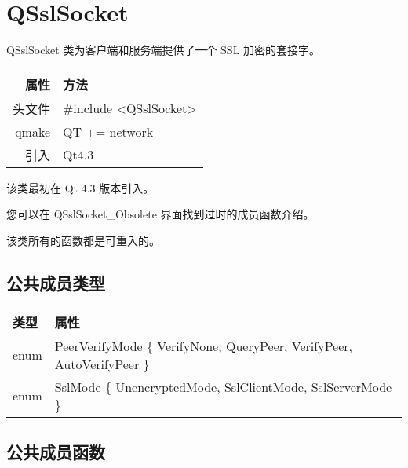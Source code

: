 \chapter{QSslSocket}

QSslSocket 类为客户端和服务端提供了一个 SSL 加密的套接字。

\begin{tabular}{|r|l|}
	\hline
	属性 & 方法 \\
	\hline
	头文件 & \#include <QSslSocket>\\      
	\hline
	qmake & QT += network\\      
	\hline
	引入 &	Qt4.3 \\ 
	\hline
\end{tabular}

该类最初在 Qt 4.3 版本引入。

您可以在 QSslSocket\_Obsolete 界面找到过时的成员函数介绍。

\begin{notice}
该类所有的函数都是可重入的。
\end{notice}



\section{公共成员类型}

\begin{tabular}[l]{|l|m{30em}|}
\hline 
类型 &	属性\\ 
\hline 
enum 	&PeerVerifyMode \{ VerifyNone, QueryPeer, VerifyPeer, AutoVerifyPeer \} \\ 
\hline  
enum &	SslMode \{ UnencryptedMode, SslClientMode, SslServerMode \} \\ 
	\hline
\end{tabular}


\section{公共成员函数}

